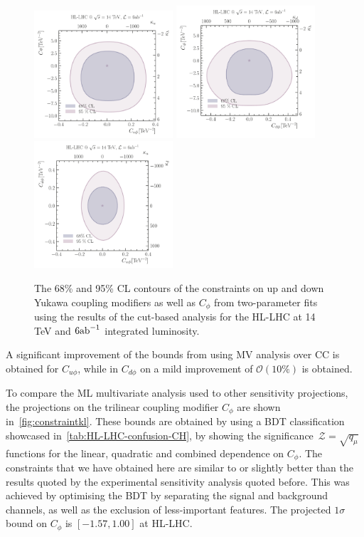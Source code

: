 \begin{figure}[htpb!]
	\centering
	\includegraphics[width=0.46\textwidth]{fig/kukl-HL-LHC} %
	\includegraphics[width=0.46\textwidth]{fig/kdkl-HL-LHC} 
	\includegraphics[width=0.46\textwidth]{fig/kdku-HL-LHC}  \\
	\caption{The  68\% and 95\% CL contours of the constraints on up and down Yukawa coupling modifiers as well as $C_\phi$ from two-parameter fits using the results of the cut-based analysis for the HL-LHC at 14 TeV and $6 \invab$ integrated luminosity. }
	\label{fig:rescut}
\end{figure}  
A significant improvement of the bounds from using MV analysis over CC is obtained for $C_{u \phi}$,  while in $C_{d\phi}$ on a mild improvement of $\mathcal O(10\%)$ is obtained.
\par To compare the ML multivariate analysis used to other sensitivity projections, the projections on the trilinear coupling modifier $C_\phi$ are shown in~\autoref{fig:constraintkl}. These bounds are obtained by using a BDT classification showcased in~\autoref{tab:HL-LHC-confusion-CH}, by showing the significance~$\mathcal Z = \sqrt{q_\mu}$ functions for the linear, quadratic and combined dependence on $C_\phi$. The constraints that we have obtained here are similar to or slightly better than the results quoted by the experimental sensitivity analysis quoted before. This was achieved by optimising the BDT by separating the signal and background channels, as well as the exclusion of less-important features. The projected $1\sigma$ bound on $C_\phi$ is $[-1.57, 1.00]$ at HL-LHC. 
